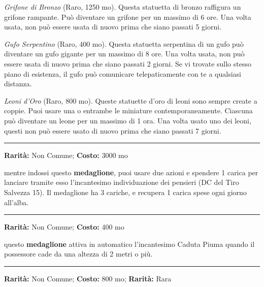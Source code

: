 \begin{multicols}{2}
\emph{Grifone di Bronzo} (Raro, 1250 mo). Questa statuetta di bronzo raffigura un grifone rampante. Può diventare un grifone per un massimo di 6 ore. Una volta usata, non può essere usata di nuovo prima che siano passati 5 giorni.

\emph{Gufo Serpentino} (Raro, 400 mo). Questa statuetta serpentina di un gufo può diventare un gufo gigante per un massimo di 8 ore. Una volta usata, non può essere usata di nuovo prima che siano passati 2 giorni. Se vi trovate sullo stesso piano di esistenza, il gufo può comunicare telepaticamente con te a qualsiasi distanza.

\emph{Leoni d'Oro} (Raro, 800 mo). Queste statuette d'oro di leoni sono sempre create a coppie. Puoi usare una o entrambe le miniature contemporaneamente. Ciascuna può diventare un leone per un massimo di 1 ora. Una volta usato uno dei leoni, questi non può essere usato di nuovo prima che siano passati 7 giorni.

\smallskip\noindent\rule{\linewidth}{2pt}  \hypertarget{MedaglionedeiPensieri}{}\smallskip{}\noindent\label{MedaglionedeiPensieri}

\textbf{Rarità:} Non Comune; \textbf{Costo:} 3000 mo

mentre indossi questo \textbf{medaglione}, puoi usare due azioni e spendere 1 carica per lanciare tramite esso l'incantesimo individuazione dei pensieri (DC del Tiro Salvezza 15). Il medaglione ha 3 cariche, e recupera 1 carica spese ogni giorno all'alba.

\smallskip\noindent\rule{\linewidth}{2pt}  \hypertarget{MedaglionedellaCadutapiuma}{}\smallskip{}\noindent\label{MedaglionedellaCadutapiuma}

\textbf{Rarità:} Non Comune; \textbf{Costo:} 400 mo

questo \textbf{medaglione} attiva in automatico l'incantesimo Caduta Piuma quando il possessore cade da una altezza di 2 metri o più.

\smallskip\noindent\rule{\linewidth}{2pt}  \hypertarget{Mithral}{}\smallskip{}\noindent\label{Mithral}

\textbf{Rarità:} Non Comune; \textbf{Costo:} 800 mo; \textbf{Rarità:} Rara


\end{multicols}
